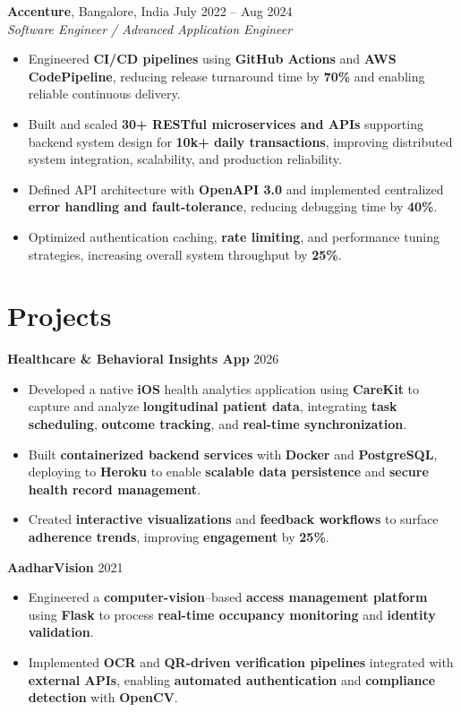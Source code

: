 \documentclass[letterpaper,11pt]{article}
\begin{document}
\textbf{Accenture}, Bangalore, India \hfill July 2022 -- Aug 2024 \\
\textit{Software Engineer / Advanced Application Engineer}
\begin{itemize}
    \item Engineered \textbf{CI/CD pipelines} using \textbf{GitHub Actions} and \textbf{AWS CodePipeline}, reducing release turnaround time by \textbf{70\%} and enabling reliable continuous delivery.
    \item Built and scaled \textbf{30+ RESTful microservices and APIs} supporting backend system design for \textbf{10k+ daily transactions}, improving distributed system integration, scalability, and production reliability.
    \item Defined API architecture with \textbf{OpenAPI 3.0} and implemented centralized \textbf{error handling and fault-tolerance}, reducing debugging time by \textbf{40\%}.
    \item Optimized authentication caching, \textbf{rate limiting}, and performance tuning strategies, increasing overall system throughput by \textbf{25\%}.
\end{itemize}

\section*{Projects}
\textbf{Healthcare \& Behavioral Insights App} \hfill 2026 \\
\begin{itemize}
    \item Developed a native \textbf{iOS} health analytics application using \textbf{CareKit} to capture and analyze \textbf{longitudinal patient data}, integrating \textbf{task scheduling}, \textbf{outcome tracking}, and \textbf{real-time synchronization}.
    \item Built \textbf{containerized backend services} with \textbf{Docker} and \textbf{PostgreSQL}, deploying to \textbf{Heroku} to enable \textbf{scalable data persistence} and \textbf{secure health record management}.
    \item Created \textbf{interactive visualizations} and \textbf{feedback workflows} to surface \textbf{adherence trends}, improving \textbf{engagement} by \textbf{25\%}.
\end{itemize}

\textbf{AadharVision} \hfill 2021 \\
\begin{itemize}
    \item Engineered a \textbf{computer-vision}–based \textbf{access management platform} using \textbf{Flask} to process \textbf{real-time occupancy monitoring} and \textbf{identity validation}.
    \item Implemented \textbf{OCR} and \textbf{QR-driven verification pipelines} integrated with \textbf{external APIs}, enabling \textbf{automated authentication} and \textbf{compliance detection} with \textbf{OpenCV}.
\end{itemize}
\end{document}
